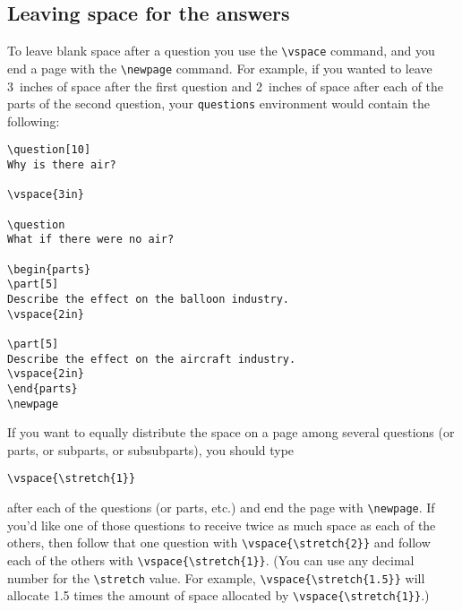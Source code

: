 \documentclass[12pt]{exam}
\makeatletter
\newcommand{\indc}[1]{\index{#1@\texttt{\char`\\#1}}}
\makeatother
\begin{document}
\subsection{Leaving space for the answers}
\label{sec:BasicSpace}

To leave blank space after a question you use the \verb"\vspace"
command, and you end a page with the \verb"\newpage" command.  For
example, if you wanted to leave 3~inches of space after the first
question and 2~inches of space after each of the parts of the second
question, your \texttt{questions} environment would contain the
following:
%
\begin{verbatim}
\question[10]
Why is there air?

\vspace{3in}

\question
What if there were no air?

\begin{parts}
\part[5]
Describe the effect on the balloon industry.
\vspace{2in}

\part[5]
Describe the effect on the aircraft industry.
\vspace{2in}
\end{parts}
\newpage
\end{verbatim}
If you want to equally distribute the space on a page among several
questions (or parts, or subparts, or subsubparts), you should
type\indc{stretch}
%
\begin{center}
  \verb"\vspace{\stretch{1}}"
\end{center}
after each of the questions (or parts, etc.\@) and end the page with
\verb"\newpage".  If you'd like one of those questions to receive
twice as much space as each of the others, then follow that one
question with \verb"\vspace{\stretch{2}}" and follow each of the
others with \verb"\vspace{\stretch{1}}".  (You can use any decimal
number for the \verb"\stretch" value.  For example,
\verb"\vspace{\stretch{1.5}}" will allocate 1.5 times the amount of
space allocated by \verb"\vspace{\stretch{1}}".)
\end{document}
